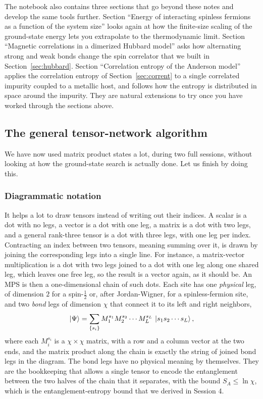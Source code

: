 \documentclass[lecture_notes.tex]{subfiles}
\begin{document}
\begin{notebook}
The notebook also contains three sections that go beyond these notes and develop the same tools
further. Section ``Energy of interacting spinless fermions as a function of
the system size'' looks again at how the finite-size scaling of the ground-state energy lets you
extrapolate to the thermodynamic limit. Section ``Magnetic correlations in a dimerized Hubbard
model'' asks how alternating strong and weak bonds change the spin correlator that we built in
Section~\ref{sec:hubbard}. Section ``Correlation entropy of the Anderson model'' applies the
correlation entropy of Section~\ref{sec:corrent} to a single correlated impurity coupled to a
metallic host, and follows how the entropy is distributed in space around the impurity. They are
natural extensions to try once you have worked through the sections above.
\end{notebook}

\subsection{The general tensor-network algorithm}
\label{sec:algorithm}
We have now used matrix product states a lot, during two full sessions, without looking at how the
ground-state search is actually done. Let us finish by doing this.

\subsubsection{Diagrammatic notation}
It helps a lot to draw tensors instead of writing out their indices. A scalar is a dot with no
legs, a vector is a dot with one leg, a matrix is a dot with two legs, and a general rank-three
tensor is a dot with three legs, with one leg per index. Contracting an index between two tensors,
meaning summing over it, is drawn by joining the corresponding legs into a single line. For
instance, a matrix-vector multiplication is a dot with two legs joined to a dot with one leg along
one shared leg, which leaves one free leg, so the result is a vector again, as it should be. An MPS
is then a one-dimensional chain of such dots. Each site has one \emph{physical} leg, of dimension
$2$ for a spin-$\tfrac12$ or, after Jordan-Wigner, for a spinless-fermion site, and two
\emph{bond} legs of dimension $\chi$ that connect it to its left and right neighbors,
\begin{equation}
  \ket{\Psi} = \sum_{\{s_i\}} M_1^{s_1}M_2^{s_2}\cdots M_L^{s_L}\,
    \ket{s_1s_2\cdots s_L},
\end{equation}
where each $M_i^{s_i}$ is a $\chi\times\chi$ matrix, with a row and a column vector at the two
ends, and the matrix product along the chain is exactly the string of joined bond legs in the
diagram. The bond legs have no physical meaning by themselves. They are the bookkeeping that allows
a single tensor to encode the entanglement between the two halves of the chain that it separates,
with the bound $S_A\le\ln\chi$, which is the entanglement-entropy bound that we derived in
Session 4.
\end{document}
